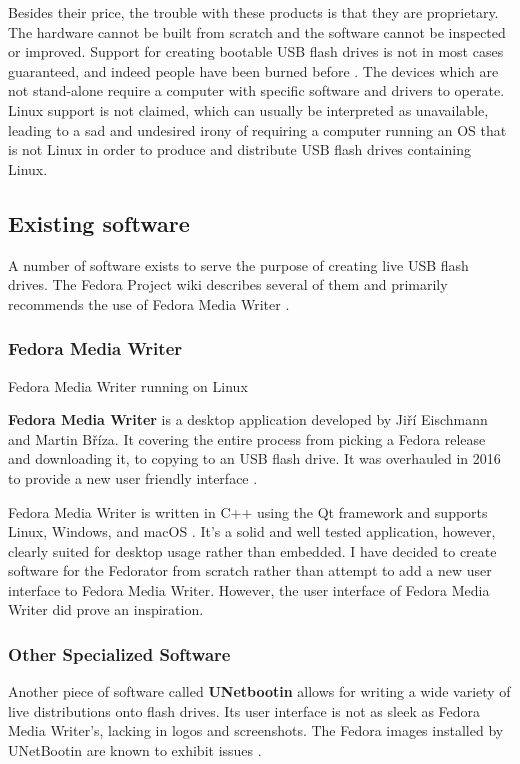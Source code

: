             Besides their price, the trouble with these products is that they are proprietary.  The hardware cannot be built from scratch and the software cannot be inspected or improved.  Support for creating bootable USB flash drives is not in most cases guaranteed, and indeed people have been burned before \cite{open-security-research-simple-duplicator}.  The devices which are not stand-alone require a computer with specific software and drivers to operate.  Linux support is not claimed, which can usually be interpreted as unavailable, leading to a sad and undesired irony of requiring a computer running an OS that is not Linux in order to produce and distribute USB flash drives containing Linux.
        \subsection{Existing software}
            A number of software exists to serve the purpose of creating live USB flash drives.  The Fedora Project wiki describes several of them and primarily recommends the use of Fedora Media Writer \cite{fedora-how-to-live-usb}.
            
            \subsubsection{Fedora Media Writer}
                    {Fedora Media Writer running on Linux  \cite{fedora-media-writer}}
                
                \textbf{Fedora Media Writer} is a desktop application developed by Jiří Eischmann and Martin Bříza.  It covering the entire process from picking a Fedora release and downloading it, to copying to an USB flash drive.  It was overhauled in 2016 to provide a new user friendly interface \cite{fedora-luc-as-primary-downloadable}.
                
                Fedora Media Writer is written in C++ using the Qt framework and supports Linux, Windows, and macOS \cite{fedora-media-writer}.  It's a solid and well tested application, however, clearly suited for desktop usage rather than embedded.  I have decided to create software for the Fedorator from scratch rather than attempt to add a new user interface to Fedora Media Writer.  However, the user interface of Fedora Media Writer did prove an inspiration.
                
            \subsubsection{Other Specialized Software}
                Another piece of software called \textbf{UNetbootin} allows for writing a wide variety of live distributions onto flash drives.  Its user interface is not as sleek as Fedora Media Writer's, lacking in logos and screenshots.  The Fedora images installed by UNetBootin are known to exhibit issues \cite{fedora-how-to-live-usb} \cite{unix-stack-exchange-error-installing-fedora-24}.
            
